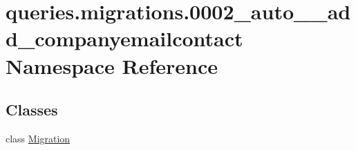 \hypertarget{namespacequeries_1_1migrations_1_10002__auto____add__companyemailcontact}{\section{queries.\-migrations.0002\-\_\-auto\-\_\-\-\_\-add\-\_\-companyemailcontact Namespace Reference}
\label{namespacequeries_1_1migrations_1_10002__auto____add__companyemailcontact}
}
\subsection*{Classes}
\begin{DoxyCompactItemize}
\item 
class \hyperlink{classqueries_1_1migrations_1_10002__auto____add__companyemailcontact_1_1_migration}{Migration}
\end{DoxyCompactItemize}

